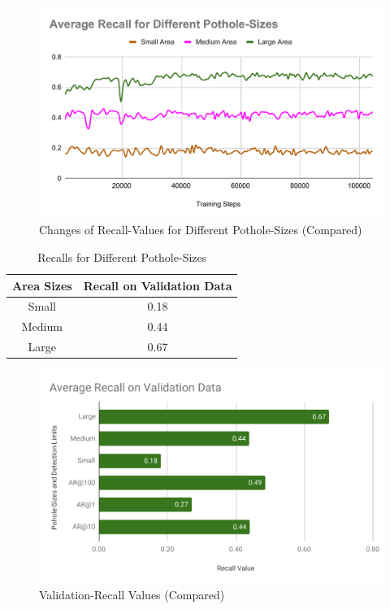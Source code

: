             \begin{figure}[ht]
                \centering
                \includegraphics[width=\textwidth]{images/Average Recall for Different Pothole-Sizes.pdf}
                \caption{Changes of Recall-Values for Different Pothole-Sizes (Compared)}
                \label{fig:recall_sizes}
            \end{figure}
            
            \begin{table}
                \centering
                \begin{tabular}{|c||c|} \hline 
                     Area Sizes  &  Recall on Validation Data \\\hline\hline
                     Small  &  0.18 \\\hline
                     Medium  &  0.44 \\\hline
                     Large  &  0.67 \\\hline
                \end{tabular}
                \caption{Recalls for Different Pothole-Sizes}
                \label{tab:recall_sizes}
            \end{table}
            
            \begin{figure}
                \centering
                \includegraphics[width=\textwidth]{images/Average Recall on Validation Data.pdf}
                \caption{Validation-Recall Values (Compared)}
                \label{fig:recalls}
            \end{figure}
            
